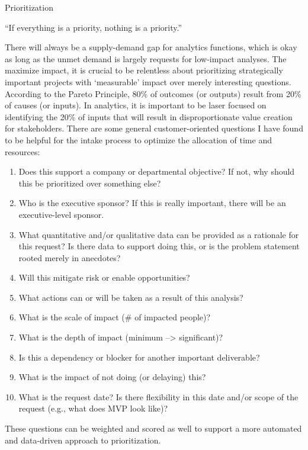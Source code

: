\documentclass[]{book}
\providecommand{\tightlist}{%
  \setlength{\itemsep}{0pt}\setlength{\parskip}{0pt}}
\begin{document}
 Prioritization

``If everything is a priority, nothing is a priority.''

There will always be a supply-demand gap for analytics functions, which is okay as long as the unmet demand is largely requests for low-impact analyses. The maximize impact, it is crucial to be relentless about prioritizing strategically important projects with `measurable' impact over merely interesting questions. According to the Pareto Principle, 80\% of outcomes (or outputs) result from 20\% of causes (or inputs). In analytics, it is important to be laser focused on identifying the 20\% of inputs that will result in disproportionate value creation for stakeholders. There are some general customer-oriented questions I have found to be helpful for the intake process to optimize the allocation of time and resources:

\begin{enumerate}
\def\labelenumi{\arabic{enumi}.}
\tightlist
\item
  Does this support a company or departmental objective? If not, why should this be prioritized over something else?
\item
  Who is the executive sponsor? If this is really important, there will be an executive-level sponsor.
\item
  What quantitative and/or qualitative data can be provided as a rationale for this request? Is there data to support doing this, or is the problem statement rooted merely in anecdotes?
\item
  Will this mitigate risk or enable opportunities?
\item
  What actions can or will be taken as a result of this analysis?
\item
  What is the scale of impact (\# of impacted people)?
\item
  What is the depth of impact (minimum --\textgreater{} significant)?
\item
  Is this a dependency or blocker for another important deliverable?
\item
  What is the impact of not doing (or delaying) this?
\item
  What is the request date? Is there flexibility in this date and/or scope of the request (e.g., what does MVP look like)?
\end{enumerate}

These questions can be weighted and scored as well to support a more automated and data-driven approach to prioritization.
\end{document}
